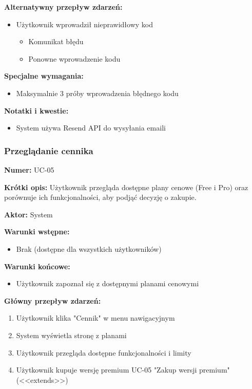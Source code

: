 \documentclass[12pt,a4paper]{article}
\begin{document}
\textbf{Alternatywny przepływ zdarzeń:}
\begin{itemize}[leftmargin=*]
    \item[4a] Użytkownik wprowadził nieprawidłowy kod
    \begin{itemize}[leftmargin=*]
    \item Komunikat błędu
    \item Ponowne wprowadzenie kodu
\end{itemize}
\end{itemize}

\textbf{Specjalne wymagania:}
\begin{itemize}[leftmargin=*]
    \item Maksymalnie 3 próby wprowadzenia błędnego kodu
\end{itemize}

\textbf{Notatki i kwestie:}
\begin{itemize}
    \item System używa Resend API do wysyłania emaili
\end{itemize}

\subsubsection{Przeglądanie cennika}

\textbf{Numer:} UC-05

\textbf{Krótki opis:} Użytkownik przegląda dostępne plany cenowe (Free i Pro) oraz porównuje ich funkcjonalności, aby podjąć decyzję o zakupie.

\textbf{Aktor:} System

\textbf{Warunki wstępne:}
\begin{itemize}[leftmargin=*]
    \item Brak (dostępne dla wszystkich użytkowników)
\end{itemize}

\textbf{Warunki końcowe:}
\begin{itemize}[leftmargin=*]
    \item Użytkownik zapoznał się z dostępnymi planami cenowymi
\end{itemize}

\textbf{Główny przepływ zdarzeń:}
\begin{enumerate}[leftmargin=*]
    \item Użytkownik klika "Cennik" w menu nawigacyjnym
    \item System wyświetla stronę z planami
    \item Użytkownik przegląda dostępne funkcjonalności i limity
    \item Użytkownik kupuje wersję premium UC-05 "Zakup wersji premium" (<<extends>>)
\end{enumerate}
\end{document}
